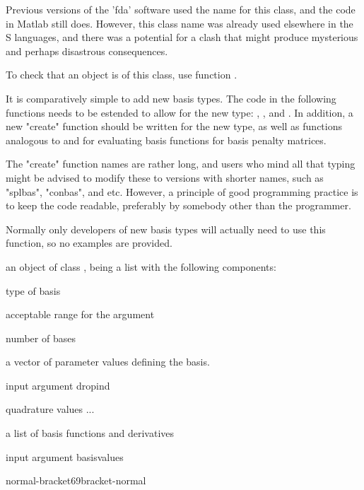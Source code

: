 \begin{Details}\relax
Previous versions of the 'fda' software used the name 
for this class, and the code in Matlab still does.  However, this
class name was already used elsewhere in the S languages, and there
was a potential for a clash that might produce mysterious and perhaps
disastrous consequences.

To check that an object is of this class, use function
.

It is comparatively simple to add new basis types.  The code in
the following functions needs to be estended to allow for the new
type: , ,
 and .
In addition, a new "create" function should be written for the
new type, as well as functions analogous to  and
 for evaluating basis functions for basis
penalty matrices.

The "create" function names are rather long, and users who mind
all that typing might be advised to modify these to versions with
shorter names, such as "splbas", "conbas", and etc.  However, a
principle of good programming practice is to keep the code readable,
preferably by somebody other than the programmer.

Normally only developers of new basis types will actually need
to use this function, so no examples are provided.
\end{Details}
\begin{Value}
an object of class , being a list with the following
components:

\begin{ldescription}
\item[\code{type}] type of basis
\item[\code{rangeval}] acceptable range for the argument
\item[\code{nbasis}] number of bases
\item[\code{params}] a vector of parameter values defining the basis.

\item[\code{dropind}] input argument dropind
\item[\code{quadvals}] quadrature values ...
\item[\code{values}] a list of basis functions and derivatives

\item[\code{basisvalues}] input argument basisvalues
\end{ldescription}

normal-bracket69bracket-normal
\end{Value}
